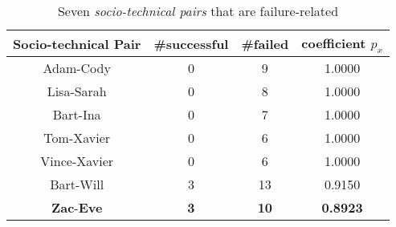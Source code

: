 \begin{table}[t]
\centering
\begin{tabular}{cccc}
\toprule
Socio-technical Pair & \#successful & \#failed & coefficient $p_x$\\
\midrule
Adam-Cody & 0 & \phantom{1}9 & 1.0000 \\
Lisa-Sarah & 0 & \phantom{1}8 & 1.0000 \\
Bart-Ina & 0 & \phantom{1}7 & 1.0000 \\
Tom-Xavier & 0 & \phantom{1}6 & 1.0000 \\
Vince-Xavier & 0 & \phantom{1}6 & 1.0000 \\
Bart-Will & 3 & 13 & 0.9150\\%
\textbf{Zac}-\textbf{Eve} & \textbf{3} & \textbf{10} & \textbf{0.8923}\\%
%
\bottomrule
\end{tabular}
\caption{Seven  \emph{socio-technical pairs} that are failure-related}
\label{tab:badstechpairs}
\end{table}
